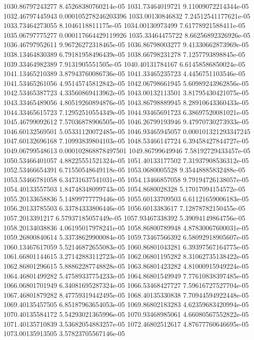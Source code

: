 {1030.86797243277 8.45268380760214e-05
1031.73464019721 9.11009072214344e-05
1032.46797445943 0.000105278246203396
1033.00130846832 7.24512541177621e-05
1033.73464273055 8.1046118811175e-05
1034.00130973499 7.61778921588411e-05
1035.06797775277 0.000117664429119926
1035.33464475722 8.66256892326926e-05
1036.46797952611 9.96726272318465e-05
1036.86798003277 9.41330662873969e-05
1038.13464830389 6.79181958496439e-05
1038.66798231278 7.1257793898845e-05
1039.33464982389 7.9131905551505e-05
1040.40131784167 6.61458586850024e-05
1041.13465210389 3.87943760086736e-05
1041.33465235723 4.4456751103546e-05
1041.53465261056 4.95145745812842e-05
1042.06798661945 5.60989243962856e-05
1042.53465387723 4.33560869413962e-05
1043.00132113501 3.81795430421075e-05
1043.33465489056 4.80519260894876e-05
1043.86798889945 8.28910643360433e-05
1044.33465615723 7.12952510554349e-05
1044.93465691723 6.38697520081021e-05
1045.46799092612 7.57036878906505e-05
1046.26799193946 9.47970730273933e-05
1046.60132569501 5.05331120072485e-05
1046.93465945057 0.000101321293347245
1047.60132696168 7.10993839804103e-05
1048.53466147724 6.39458427844727e-05
1049.06799548613 0.000102868878497501
1049.86799649946 7.58192729433457e-05
1050.53466401057 4.88225551521324e-05
1051.40133177502 7.31937908536312e-05
1052.53466654391 6.71550548649118e-05
1053.0680005528 9.35448885832488e-05
1053.53466781058 6.34731637541031e-05
1054.13466857058 9.79194726138057e-05
1054.40133557503 1.84748348099743e-05
1054.8680028328 5.17017094154572e-05
1055.20133658836 5.14899777779446e-05
1055.60133709503 6.61121659006183e-05
1056.20133785503 6.33784333806446e-05
1056.6013383617 7.12878782150455e-05
1057.2013391217 6.57937185057449e-05
1057.93467338392 5.39094149864756e-05
1058.20134038836 4.06195017978241e-05
1058.86800789948 4.87830067600031e-05
1059.26800840614 5.33738629900084e-05
1059.73467566392 6.58092918905607e-05
1060.13467617059 5.52146872655083e-05
1060.86801043281 6.39397567164775e-05
1061.66801144615 3.27142883112723e-05
1062.06801195282 8.31062735138422e-05
1062.86801296615 5.88862287748828e-05
1063.86801423282 4.81000915949224e-05
1064.46801499282 5.47589337754233e-05
1064.86801549949 7.77610838397485e-05
1066.06801701949 6.34081695287324e-05
1066.53468427727 7.59616727527704e-05
1067.46801879282 8.47759319442495e-05
1068.40135330838 7.70944594922448e-05
1069.40135457505 6.85187963654053e-05
1069.86802183283 4.62359683420994e-05
1070.40135584172 5.54293021365996e-05
1070.93468985061 4.66080567552822e-05
1071.40135710839 3.53682054883257e-05
1072.46802512617 4.87677760646695e-05
1073.00135913505 3.57823705567146e-05
}
